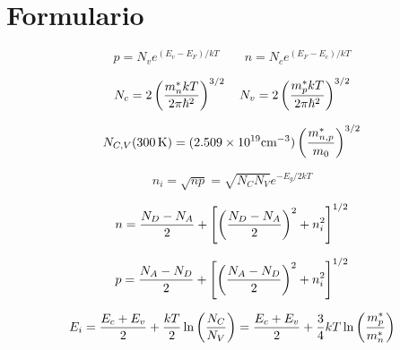 
\section*{Formulario}

{\footnotesize 
\begin{multicols}{2}
	\begin{Formulario}
		\begin{equation*}
			p=N_v e^{(E_v-E_F)/kT}  \qquad n = N_c e^{(E_F-E_c)/kT}
		\end{equation*}
	\end{Formulario}
	\begin{Formulario}
		\begin{equation*}
			N_c = 2 \left( \frac{m_n^* kT}{2\pi\hbar^2} \right)^{3/2} \quad
			N_v = 2 \left( \frac{m_p^* kT}{2\pi\hbar^2} \right)^{3/2}
		\end{equation*}
	\end{Formulario}
	\begin{Formulario}
		\begin{equation*}
			N_{C,V} (\SI{300}{\kelvin})= (2.509\times10^{19} \text{cm}^{-3}) \left( \frac{m_{n,p}^*}{m_0} \right)^{3/2}
		\end{equation*}
	\end{Formulario}
	\begin{Formulario}
		\begin{equation*}
			n_i = \sqrt{np} = \sqrt{N_CN_V} e^{-E_g/2kT}
		\end{equation*}
	\end{Formulario}
	\begin{Formulario}
		\begin{equation*}
			n = \frac{N_D-N_A}{2} + \left[ \left( \frac{N_D-N_A}{2} \right)^2 + n_i^2 \right]^{1/2}
		\end{equation*}
	\end{Formulario}
	\begin{Formulario}
		\begin{equation*}
			p = \frac{N_A-N_D}{2} + \left[ \left( \frac{N_A-N_D}{2} \right)^2 + n_i^2 \right]^{1/2}
		\end{equation*}
	\end{Formulario}
	\begin{Formulario}
		\begin{equation*}
			E_i = \frac{E_c+E_v}{2} + \frac{kT}{2} \ln \left( \frac{N_C}{N_V} \right) = \frac{E_c+E_v}{2} + \frac{3}{4} kT \ln \left( \frac{m_p^*}{m_n^*} \right)
		\end{equation*}
	\end{Formulario}

\end{multicols}}
